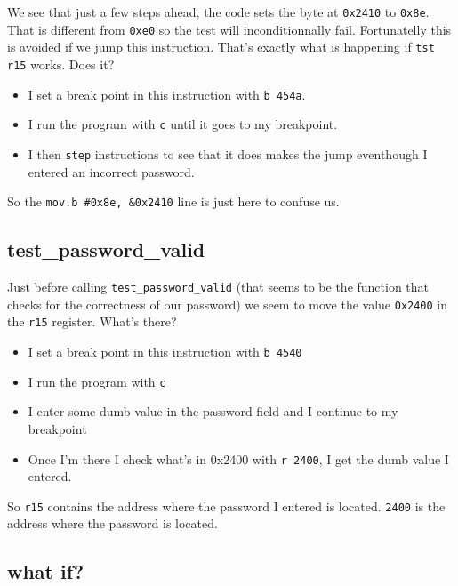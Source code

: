 We see that just a few steps ahead, the code sets the byte at
\texttt{0x2410} to \texttt{0x8e}. That is different from \texttt{0xe0}
so the test will inconditionnally fail. Fortunatelly this is avoided if
we jump this instruction. That's exactly what is happening if
\texttt{tst r15} works. Does it?

\begin{itemize}
\itemsep1pt\parskip0pt
\item
  I set a break point in this instruction with \texttt{b 454a}.
\item
  I run the program with \texttt{c} until it goes to my breakpoint.
\item
  I then \texttt{step} instructions to see that it does makes the jump
  eventhough I entered an incorrect password.
\end{itemize}

So the \texttt{mov.b \#0x8e, \&0x2410} line is just here to confuse us.

\subsection{test\_password\_valid}\label{testux5fpasswordux5fvalid}

Just before calling \texttt{test\_password\_valid} (that seems to be the
function that checks for the correctness of our password) we seem to
move the value \texttt{0x2400} in the \texttt{r15} register. What's
there?

\begin{itemize}
\itemsep1pt\parskip0pt
\item
  I set a break point in this instruction with \texttt{b 4540}
\item
  I run the program with \texttt{c}
\item
  I enter some dumb value in the password field and I continue to my
  breakpoint
\item
  Once I'm there I check what's in 0x2400 with \texttt{r 2400}, I get
  the dumb value I entered.
\end{itemize}

So \texttt{r15} contains the address where the password I entered is
located. \texttt{2400} is the address where the password is located.

\subsection{what if?}\label{what-if}

